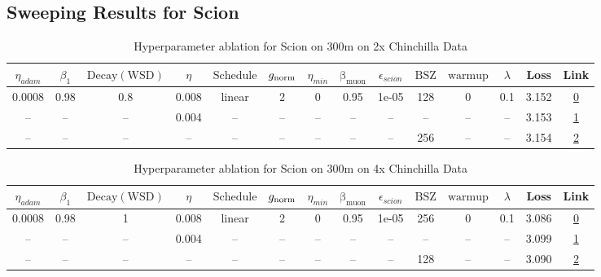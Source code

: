 \subsection{Sweeping Results for Scion}%
\begin{table}[H]
\centering
\caption{Hyperparameter ablation for Scion on 300m on 2x Chinchilla Data}
\label{tab:ablation_scion_300m_on_2x_chinchilla_data}
\begin{tabular}{cccccccccccccc}
\toprule
$\eta_{adam}$ & $\beta_1$ & $\mathrm{Decay (WSD)}$ & $\eta$ & $\mathrm{Schedule}$ & $g_{\mathrm{norm}}$ & $\eta_{min}$ & $\mathrm{\beta_{muon}}$ & $\epsilon_{scion}$ & $\mathrm{BSZ}$ & $\mathrm{warmup}$ & $\lambda$ & Loss & Link \\
\midrule
0.0008 & 0.98 & 0.8 & 0.008 & linear & 2 & 0 & 0.95 & 1e-05 & 128 & 0 & 0.1 & 3.152 & \href{https://wandb.ai/marin-community/optimizer-scaling/runs/sweep-300m-12B-scion4b55fclr0.008-wd0.1-minlr0-warmup0-b10.98-gn-2aec1d}{0} \\
\midrule
-- & -- & -- & 0.004 & -- & -- & -- & -- & -- & -- & -- & -- & 3.153 & \href{https://wandb.ai/marin-community/optimizer-scaling/runs/sweep-300m-12B-scionac146alr0.004-wd0.1-minlr0-warmup0-b10.98-gn-3fb1ff}{1} \\
-- & -- & -- & -- & -- & -- & -- & -- & -- & 256 & -- & -- & 3.154 & \href{https://wandb.ai/marin-community/optimizer-scaling/runs/sweep-300m-12B-scion26da5flr0.008-wd0.1-minlr0-warmup0-b10.98-gn-81fece}{2} \\
\bottomrule
\end{tabular}
\end{table}

\begin{table}[H]
\centering
\caption{Hyperparameter ablation for Scion on 300m on 4x Chinchilla Data}
\label{tab:ablation_scion_300m_on_4x_chinchilla_data}
\begin{tabular}{cccccccccccccc}
\toprule
$\eta_{adam}$ & $\beta_1$ & $\mathrm{Decay (WSD)}$ & $\eta$ & $\mathrm{Schedule}$ & $g_{\mathrm{norm}}$ & $\eta_{min}$ & $\mathrm{\beta_{muon}}$ & $\epsilon_{scion}$ & $\mathrm{BSZ}$ & $\mathrm{warmup}$ & $\lambda$ & Loss & Link \\
\midrule
0.0008 & 0.98 & 1 & 0.008 & linear & 2 & 0 & 0.95 & 1e-05 & 256 & 0 & 0.1 & 3.086 & \href{https://wandb.ai/marin-community/optimizer-scaling/runs/sweep-300m-24B-scion5f20d1lr0.008-wd0.1-minlr0-warmup0-b10.98-gn-d1d7e4}{0} \\
\midrule
-- & -- & -- & 0.004 & -- & -- & -- & -- & -- & -- & -- & -- & 3.099 & \href{https://wandb.ai/marin-community/optimizer-scaling/runs/sweep-300m-24B-scion5f85f9lr0.004-wd0.1-minlr0-warmup0-b10.98-gn-af9727}{1} \\
-- & -- & -- & -- & -- & -- & -- & -- & -- & 128 & -- & -- & 3.090 & \href{https://wandb.ai/marin-community/optimizer-scaling/runs/sweep-300m-24B-scion488717lr0.008-wd0.1-minlr0-warmup0-b10.98-gn-f0adfa}{2} \\
\bottomrule
\end{tabular}
\end{table}

